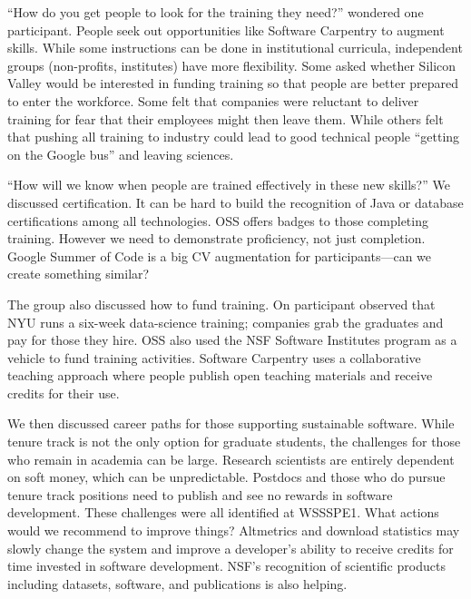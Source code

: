 \documentclass[11pt, oneside]{amsart}
\begin{document}
``How do you get people to look for the training they need?'' wondered one
participant. People seek out opportunities like Software Carpentry to augment
skills. While some instructions can be done in institutional curricula,
independent groups (non-profits, institutes) have more flexibility. Some asked
whether Silicon Valley would be interested in funding training so that people are
better prepared to enter the workforce. Some felt that companies were reluctant
to deliver training for fear that their employees might then leave them. While others felt
that pushing all training to industry could lead to good technical people
``getting on the Google bus'' and leaving sciences.

``How will we know when people are trained effectively in these new skills?'' We
discussed certification. It can be hard to build the recognition of Java or
database certifications among all technologies. OSS offers badges to those
completing training. However we need to demonstrate proficiency, not just
completion. Google Summer of Code is a big CV augmentation for
participants---can we create something similar?

The group also discussed how to fund training. On participant observed that NYU
runs a six-week data-science training; companies grab the graduates and pay for
those they hire. OSS also used the NSF Software Institutes program as a vehicle
to fund training activities. Software Carpentry uses a collaborative teaching
approach where people publish open teaching materials and receive credits for
their use.

We then discussed career paths for those supporting sustainable software. While
tenure track is not the only option for graduate students, the challenges for those who
remain in academia can be large. Research scientists are entirely dependent on
soft money, which can be unpredictable. Postdocs and those who do pursue tenure
track positions need to publish and see no rewards in software development.
These challenges were all identified at WSSSPE1. What actions would we recommend
to improve things? Altmetrics and download statistics may slowly change the
system and improve a developer's ability to receive credits for time invested in
software development. NSF's recognition of scientific products including datasets,
software, and publications is also helping.
\end{document}
